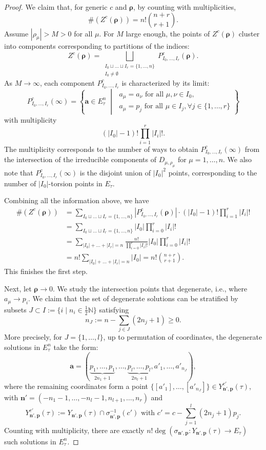 \documentclass[11pt]{amsart}
\theoremstyle{remark}
\numberwithin{equation}{section}
\begin{document}
\begin{proof}
We claim that, for generic $c$ and $\boldsymbol{\rho}$, by counting with multiplicities, 
\[
\#(Z^c(\boldsymbol{\rho})) = n! \binom{n+r}{r+1}.
\]
Assume $|\rho_\mu| >M>0$ for all $\mu$. For $M$ large enough, the points of $Z^c(\boldsymbol{\rho})$ cluster into components corresponding to partitions of the indices:
\[
Z^c(\boldsymbol{\rho}) = \bigsqcup_{\substack{I_0 \sqcup \dots \sqcup I_r = \{1,\dots,n\} \\ I_0 \neq \emptyset }} P_{I_0,\dots,I_r}^c (\boldsymbol{\rho}).
\]
As $M \to \infty$, each component $P^c_{I_0,\dots,I_r}$ is characterized by its limit:
\[
P_{I_0,\dots,I_r}^c(\infty) = 
\left\{
\mathbf{a}\in E_\tau^n \;\middle|\; 
\begin{array}{l}
a_\mu = a_\nu \text{ for all } \mu, \nu \in I_0, \\
a_\mu = p_j \text{ for all } \mu \in I_j, \forall j \in \{1,\dots,r\}
\end{array}
\right\}
\]
with multiplicity
\[
(|I_0|-1)! \prod_{i=1}^r |I_i|!.
\] 
The multiplicity corresponds to the number of ways to obtain $P_{I_0,\dots,I_r}^c(\infty)$ from the intersection of the irreducible components of $D_{\mu,\rho_\mu}$ for $\mu=1,\dots,n$. We also note that $P_{I_0,\dots,I_r}^c(\infty)$ is the disjoint union of $|I_0|^2$ points, corresponding to the number of $|I_0|$-torsion points in $E_\tau$.

Combining all the information above, we have 
\[
\begin{split}
\#(Z^c(\boldsymbol{\rho})) &=  \sum_{I_0 \sqcup \dots \sqcup I_r = \{1,\dots,n\}} | P_{I_0,\dots,I_r}^c (\boldsymbol{\rho}) | \cdot (|I_0|-1)! \prod_{i=1}^r |I_i|!
\\
&= \sum_{I_0 \sqcup \dots \sqcup I_r = \{1,\dots,n\}}   |I_0|\prod_{i=0}^r |I_i|!
\\
&= \sum_{|I_0|+\dots+|I_r|=n} \frac{n!}{\prod_{i=0}^r |I_i|!} |I_0|\prod_{i=0}^r |I_i|!
\\
&= n! \sum_{|I_0|+\dots+|I_r|=n} |I_0| = n! \binom{n+r}{r+1}.
\end{split}
\]
This finishes the first step.

Next, let $\boldsymbol{\rho} \to 0$. We study the intersection points that degenerate, i.e., where $a_\mu \to p_i$. We claim that the set of degenerate solutions can be stratified by subsets $J \subset I := \{ i \mid n_i \in  \tfrac{1}{2} \mathbb{N} \}$ satisfying 
\[
n_J := n - \sum_{j \in J} (2n_j+1) \ge 0.
\]
More precisely, for $J=\{ 1,\dots,l \}$, up to permutation of coordinates, the degenerate solutions in $E_\tau^n$ take the form:
\[
    \mathbf{a} = (\underbrace{p_1, \dots, p_1}_{2n_1+1}, \dots, \underbrace{p_l, \dots, p_l}_{2n_l+1}, a'_1, \dots, a'_{n_J}),
\]
where the remaining coordinates form a point $\{[a'_1], \dots, [a'_{n_J}]\} \in Y_{\mathbf{n}',\mathbf{p}}^{c'}(\tau)$,
with $\mathbf{n}' = ( -n_1-1,\dots,-n_l-1,n_{l+1}, \dots,n_r )$ and 
\[
    Y_{\mathbf{n}',\mathbf{p}}^{c'}(\tau) := Y_{\mathbf{n}',\mathbf{p}}(\tau) \cap \sigma_{\mathbf{n}',\mathbf{p}}^{-1}(c') \text{ with }  c' = c- \sum_{j=1}^l (2n_j+1) p_j.
\]
Counting with multiplicity, there are exactly $n! \deg (\sigma_{\mathbf{n}',\mathbf{p}}: Y_{\mathbf{n}',\mathbf{p}}(\tau) \to E_\tau)$ such solutions in $E_\tau^n$.


\end{proof}
\end{document}

